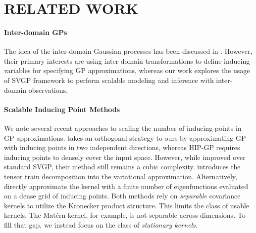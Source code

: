 \section{RELATED WORK}
\paragraph{Inter-domain GPs} The idea of the inter-domain Gaussian processes has been discussed
in \citep{lazaro2009inter, van2020framework}.
However, their primary interests are 
using inter-domain transformations to define inducing variables for specifying GP approximations, whereas our work explores the usage of SVGP framework to perform scalable modeling and inference
with inter-domain observations.


\paragraph{Scalable Inducing Point Methods}
We note several recent approaches to scaling
the number of inducing points in GP approximations.
\citet{shi2020sparse} takes an orthogonal strategy to ours by approximating GP with inducing points in two independent directions, whereas HIP-GP requires inducing points to densely cover the input space. However, while improved over standard SVGP, their method still remains a cubic complexity.
\citet{izmailov2018scalable} introduces
the tensor train decomposition into the variational approximation.
Alternatively, \citet{evans2018scalable} directly approximate the kernel with a
finite number of eigenfunctions evaluated on a dense grid of inducing points.
Both methods rely on \emph{separable} covariance kernels
to utilize the Kronecker product structure. This limits the
class of usable kernels.
The Matérn kernel, for example, is not separable across dimensions.
To fill that gap, we instead focus on the class of \emph{stationary kernels}.  

